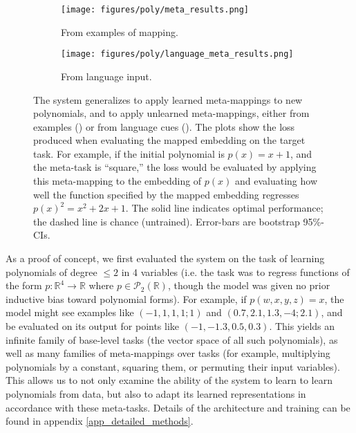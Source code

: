 \documentclass{article}
\begin{document}
\begin{figure}
\centering
\begin{subfigure}{0.5\textwidth}
\texttt{[image: figures/poly/meta\_results.png]}
\caption{From examples of mapping.}
\label{poly_meta_map_results_examples}
\end{subfigure}%
\begin{subfigure}{0.5\textwidth}
\texttt{[image: figures/poly/language\_meta\_results.png]}
\caption{From language input.}
\label{poly_meta_map_results_language}
\end{subfigure}
\caption{The system generalizes to apply learned meta-mappings to new polynomials, and to apply unlearned meta-mappings, either from examples () or from language cues (). The plots show the loss produced when evaluating the mapped embedding on the target task. For example, if the initial polynomial is $p(x) = x + 1$, and the meta-task is ``square,'' the loss would be evaluated by applying this meta-mapping to the embedding of $p(x)$ and evaluating how well the function specified by the mapped embedding regresses $p(x)^2 = x^2 + 2x + 1$. The solid line indicates optimal performance; the dashed line is chance (untrained). Error-bars are bootstrap 95\%-CIs.} 
\label{poly_meta_map_results}
\end{figure}
As a proof of concept, we first evaluated the system on the task of learning polynomials of degree $\leq 2$ in 4 variables (i.e. the task was to regress functions of the form $p: \mathbb{R}^4 \rightarrow \mathbb{R}$ where $p \in \mathcal{P}_2 \left(\mathbb{R}\right)$, though the model was given no prior inductive bias toward polynomial forms). For example, if $p(w,x,y,z) = x$, the model might see examples like $(-1,1,1,1; 1)$ and $(0.7, 2.1, 1.3, -4; 2.1)$, and be evaluated on its output for points like $(-1, -1.3, 0.5, 0.3)$. This yields an infinite family of base-level tasks (the vector space of all such polynomials), as well as many families of meta-mappings over tasks (for example, multiplying polynomials by a constant, squaring them, or permuting their input variables). This allows us to not only examine the ability of the system to learn to learn polynomials from data, but also to adapt its learned representations in accordance with these meta-tasks. Details of the architecture and training can be found in appendix \ref{app_detailed_methods}.\par
\vspace{-0.7em}
\end{document}
